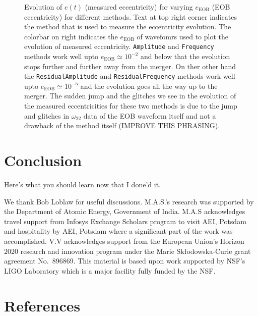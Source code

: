 \documentclass[aps,prd,amsmath,floats,floatfix, twocolumn,
superscriptaddress,nofootinbib,showpacs]{revtex4-1}
\begin{document}
\begin{figure}[thb]
\caption{Evolution of $e(t)$ (measured eccentricity) for varying $e_{\text{EOB}}$ (EOB eccentricity) for different methods. Text at top right corner indicates the method that is used to measure the eccentricity evolution. The colorbar on right indicates the $e_{\text{EOB}}$ of wavefomrs used to plot the evolution of measured eccentricity. \texttt{Amplitude} and \texttt{Frequency} methods work well upto $e_{\text{EOB}} \simeq 10^{-2}$ and below that the evolution stops further and further away from the merger. On ther other hand the \texttt{ResidualAmplitude} and \texttt{ResidualFrequency} methods work well upto $e_{\text{EOB}} \simeq 10^{-5}$ and the evolution goes all the way up to the merger. The sudden jump and the glitches we see in the evolution of the measured eccentricities for these two methods is due to the jump and glitches in $\omega_{22}$ data of the EOB waveform itself and not a drawback of the method itself (IMPROVE THIS PHRASING).}
\label{fig:measured_ecc_vs_time}
\end{figure}

\section{Conclusion}
\label{sec:conclusion}
Here's what you should learn now that I done'd it.


\begin{acknowledgments}
We thank Bob Loblaw for useful discussions.
M.A.S.’s research was supported by the Department of Atomic Energy, Government of
India. M.A.S acknowledges travel support from Infosys Exchange Scholars program to visit
AEI, Potsdam and hospitality by AEI, Potsdam where a significant part of the work was
accomplished.
V.V acknowledges support from the European Union’s Horizon 2020 research and
innovation program under the Marie Skłodowska-Curie grant agreement No.~896869.
This material is based upon work supported by NSF's LIGO Laboratory which is a
major facility fully funded by the NSF.
\end{acknowledgments}

\section*{References}

\end{document}
